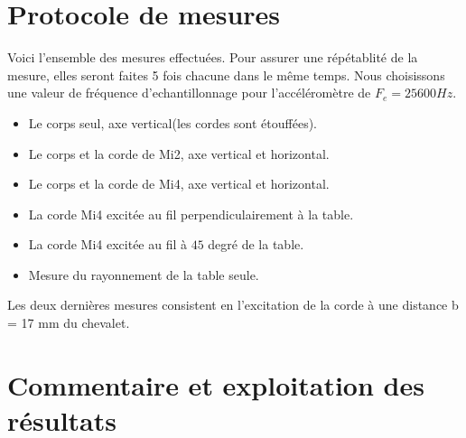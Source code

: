 
\section{Protocole de mesures}
Voici l'ensemble des mesures effectuées. Pour assurer une répétablité de la mesure, elles seront faites 5 fois chacune dans le même temps. Nous choisissons une valeur de fréquence d'echantillonnage pour l'accéléromètre de  $F_e = 25600Hz$.
\begin{itemize}
\item Le corps seul, axe vertical(les cordes sont étouffées).
\item Le corps et la corde de Mi2, axe vertical et horizontal.
\item Le corps et la corde de Mi4, axe vertical et horizontal.
\item La corde Mi4 excitée au fil perpendiculairement à la table.
\item La corde Mi4 excitée au fil à $45$ degré de la table.
\item Mesure du rayonnement de la table seule.
\end{itemize}
Les deux dernières mesures consistent en l'excitation de la corde à une distance b = 17 mm du chevalet. 

\section{Commentaire et exploitation des résultats}
